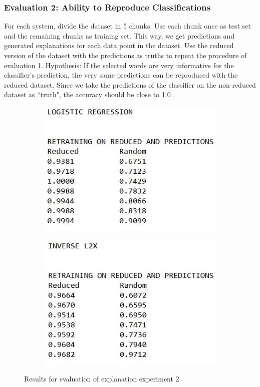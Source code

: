 {\subsubsection{Evaluation 2: Ability to Reproduce Classifications}
For each system, divide the dataset in 5 chunks. Use each chunk once as test set and the remaining chunks as training set. This way, we get predictions and generated explanations for each data point in the dataset. Use the reduced version of the dataset with the predictions as truths to repeat the procedure of evaluation 1. Hypothesis: If the selected words are very informative for the classifier's prediction, the very same predictions can be reproduced with the reduced dataset. Since we take the predictions of the classifier on the non-reduced dataset as ``truth", the accuracy should be close to 1.0 .
\begin{figure}[H]
	\centering
	\begin{subfigure}[b]{0.4\textwidth}
		\includegraphics[width=\textwidth]{img/expleval2_logreg.JPG}
	\end{subfigure}
	\begin{subfigure}[b]{0.4\textwidth}
		\includegraphics[width=\textwidth]{img/expleval2_invL2X.JPG}
	\end{subfigure}
	\caption{Results for evaluation of explanation experiment 2}
	\label{fig:results_expleval2}
\end{figure}



}
